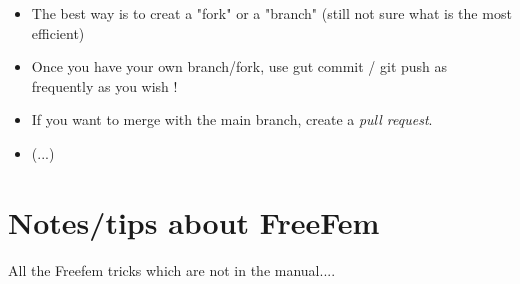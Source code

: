 \begin {itemize}

\item The best way is to creat a "fork" or a "branch" (still not sure what is the most efficient)

\item Once you have your own branch/fork, use gut commit / git push as frequently as you wish !

\item If you want to merge with the main branch, create a {\em pull request}.

\item (...)

\end{itemize}

\section{Notes/tips about FreeFem}

All the Freefem tricks which are not in the manual....





